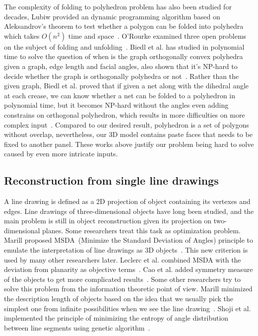 The complexity of folding to polyhedron problem has also been studied for decades, Lubiw provided an dynamic programming algorithm based on Aleksandrov's theorem to test whether a polygon can be folded into polyhedra which takes $O(n^2)$ time and space~\cite{Lubiw1996When}. 
O'Rourke examined three open problems on the subject of folding and unfolding~\cite{O'Rourke:1998:FUC:646319.686376}. 
Biedl et al. has studied in polynomial time to solve the question of when is the graph orthogonally convex polyhedra given a graph, edge length and facial angles, also shown that it's NP-hard to decide whether the graph is orthogonally polyhedra or not~\cite{Biedl2004When}. Rather than the given graph, Biedl et al. proved that if given a net along with the dihedral angle at each crease, we can know whether a net can be folded to a polyhedron in polynomial time, but it becomes NP-hard without the angles even adding constrains on orthogonal polyhedron, which results in more difficulties on more complex input~\cite{Biedl:2005:NFP:1090462.1646553}.
Compared to our desired result, polyhedron is a set of polygons without overlap, nevertheless, our 3D model contains paste faces that needs to be fixed to another panel. 
These works above justify our problem being hard to solve caused by even more intricate inputs.

\subsection{Reconstruction from single line drawings} 
A line drawing is defined as a 2D projection of object containing its vertexes and edges. Line drawings of three-dimensional objects have long been studied, and the main problem is still in object reconstruction given its projection on two-dimensional planes. 
Some researchers treat this task as optimization problem. 
Marill proposed MSDA~(Minimize the Standard Deviation of Angles) principle to emulate the interpretation of line drawings as 3D objects~\cite{Marill:1991:EHI:113057.113061}. 
This new criterion is used by many other researchers later. 
Leclerc et al. combined MSDA with the deviation from planarity as objective terms~\cite{Leclerc1992An}. 
Cao et al. added symmetry measure of the objects to get more complicated results~\cite{Cao:2005:ORS:1097114.1097658}. 
Some other researchers try to solve this problem from the information theoretic point of view. 
Marill minimized the description length of objects based on the idea that we usually pick the simplest one from infinite possibilities when we see the line drawing~\cite{Marill1992Why}. 
Shoji et al. implemented the principle of minimizing the entropy of angle distribution between line segments using genetic algorithm~\cite{Shoji20013}.{}

